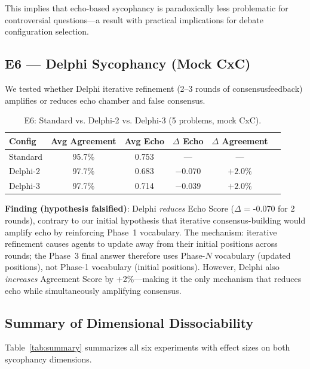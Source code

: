 \documentclass[11pt]{article}
\begin{document}
This implies that echo-based sycophancy is paradoxically less problematic for controversial questions---a result with practical implications for debate configuration selection.

\subsection{E6 — Delphi Sycophancy (Mock CxC)}
\label{sec:e6}

We tested whether Delphi iterative refinement (2--3 rounds of consensusfeedback) amplifies or reduces echo chamber and false consensus.

\begin{table}[h]
\centering
\caption{E6: Standard vs. Delphi-2 vs. Delphi-3 (5 problems, mock CxC).}
\label{tab:e6}
\begin{tabular}{lccccc}
\toprule
Config & Avg Agreement & Avg Echo & $\Delta$ Echo & $\Delta$ Agreement \\
\midrule
Standard & 95.7\% & 0.753 & --- & --- \\
Delphi-2 & 97.7\% & 0.683 & $\mathbf{-0.070}$ & $+2.0\%$ \\
Delphi-3 & 97.7\% & 0.714 & $-0.039$ & $+2.0\%$ \\
\bottomrule
\end{tabular}
\end{table}

\noindent\textbf{Finding (hypothesis falsified)}: Delphi \textit{reduces} Echo Score ($\Delta$ = -0.070 for 2 rounds), contrary to our initial hypothesis that iterative consensus-building would amplify echo by reinforcing Phase~1 vocabulary. The mechanism: iterative refinement causes agents to update away from their initial positions across rounds; the Phase~3 final answer therefore uses Phase-$N$ vocabulary (updated positions), not Phase-1 vocabulary (initial positions). However, Delphi also \textit{increases} Agreement Score by +2\%---making it the only mechanism that reduces echo while simultaneously amplifying consensus.

\subsection{Summary of Dimensional Dissociability}

Table~\ref{tab:summary} summarizes all six experiments with effect sizes on both sycophancy dimensions.
\end{document}
